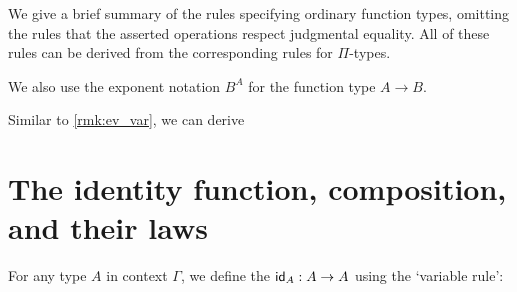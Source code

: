 We give a brief summary of the rules specifying ordinary function types, omitting the rules that the asserted operations respect judgmental equality. All of these rules can be derived from the corresponding rules for $\Pi$-types.
\begin{prooftree}
\end{prooftree}%
\begin{prooftree}
\end{prooftree}%
\begin{prooftree}
\end{prooftree}%
\begin{prooftree}
\end{prooftree}%
\begin{prooftree}
\end{prooftree}

\begin{rmk}
We also use the exponent notation $B^A$ for the function type $A\to B$.
\end{rmk}

\begin{rmk}
Similar to \cref{rmk:ev_var}, we can derive
\begin{prooftree}
\end{prooftree}
\end{rmk}

\section{The identity function, composition, and their laws}
\begin{defn}
For any type $A$ in context $\Gamma$, we define the  $\idfunc[A]:A\to A$ using the `variable rule':
\begin{prooftree}
\end{prooftree}
\end{defn}

